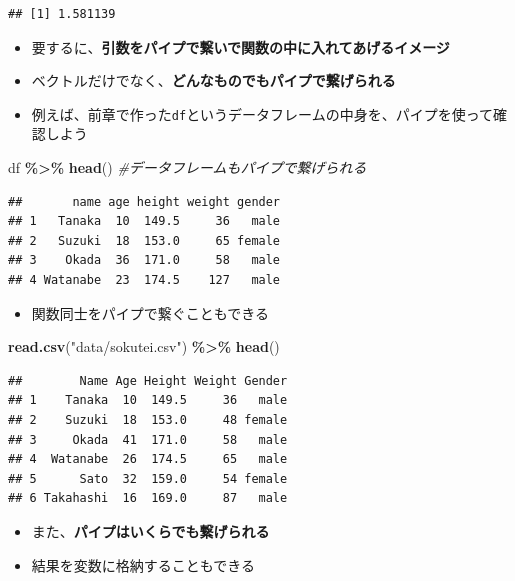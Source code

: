 \documentclass[
]{book}
\newenvironment{Shaded}{\begin{snugshade}}{\end{snugshade}}
\newcommand{\CommentTok}[1]{\textcolor[rgb]{0.56,0.35,0.01}{\textit{#1}}}
\newcommand{\FunctionTok}[1]{\textcolor[rgb]{0.13,0.29,0.53}{\textbf{#1}}}
\newcommand{\NormalTok}[1]{#1}
\newcommand{\SpecialCharTok}[1]{\textcolor[rgb]{0.81,0.36,0.00}{\textbf{#1}}}
\newcommand{\StringTok}[1]{\textcolor[rgb]{0.31,0.60,0.02}{#1}}
\providecommand{\tightlist}{%
  \setlength{\itemsep}{0pt}\setlength{\parskip}{0pt}}
\begin{document}
\begin{verbatim}
## [1] 1.581139
\end{verbatim}

\begin{itemize}
\tightlist
\item
  要するに、\textbf{引数をパイプで繋いで関数の中に入れてあげるイメージ}
\item
  ベクトルだけでなく、\textbf{どんなものでもパイプで繋げられる}
\item
  例えば、前章で作った\texttt{df}というデータフレームの中身を、パイプを使って確認しよう
\end{itemize}

\begin{Shaded}
\begin{Highlighting}[]
\NormalTok{df }\SpecialCharTok{\%\textgreater{}\%} \FunctionTok{head}\NormalTok{() }\CommentTok{\#データフレームもパイプで繋げられる}
\end{Highlighting}
\end{Shaded}

\begin{verbatim}
##       name age height weight gender
## 1   Tanaka  10  149.5     36   male
## 2   Suzuki  18  153.0     65 female
## 3    Okada  36  171.0     58   male
## 4 Watanabe  23  174.5    127   male
\end{verbatim}

\begin{itemize}
\tightlist
\item
  関数同士をパイプで繋ぐこともできる
\end{itemize}

\begin{Shaded}
\begin{Highlighting}[]
\FunctionTok{read.csv}\NormalTok{(}\StringTok{"data/sokutei.csv"}\NormalTok{) }\SpecialCharTok{\%\textgreater{}\%} \FunctionTok{head}\NormalTok{() }
\end{Highlighting}
\end{Shaded}

\begin{verbatim}
##        Name Age Height Weight Gender
## 1    Tanaka  10  149.5     36   male
## 2    Suzuki  18  153.0     48 female
## 3     Okada  41  171.0     58   male
## 4  Watanabe  26  174.5     65   male
## 5      Sato  32  159.0     54 female
## 6 Takahashi  16  169.0     87   male
\end{verbatim}

\begin{itemize}
\tightlist
\item
  また、\textbf{パイプはいくらでも繋げられる}
\item
  結果を変数に格納することもできる
\end{itemize}
\end{document}
